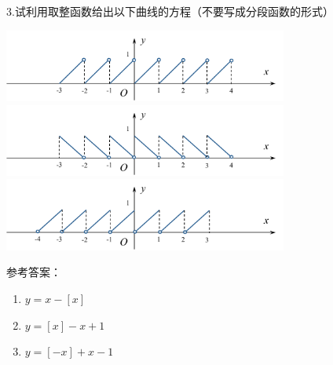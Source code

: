 \bs
3.试利用取整函数给出以下曲线的方程（不要写成分段函数的形式）
  \begin{center}
  	\includegraphics[width=0.7\textwidth]{./images/Ch01/f1.pdf}\\
  	\includegraphics[width=0.7\textwidth]{./images/Ch01/f2.pdf}\\
  	\includegraphics[width=0.7\textwidth]{./images/Ch01/f3.pdf}
  \end{center}

参考答案：
\begin{enumerate}[(1)]
	\setlength{\itemindent}{1cm}
	\item $y=x-[x]$
	\item $y=[x]-x+1$
	\item $y=[-x]+x-1$
\end{enumerate}


